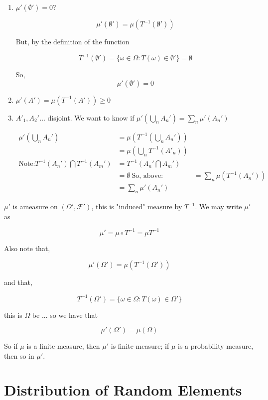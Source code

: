 \documentclass[11pt,fleqn]{book} %
\begin{document}
	\begin{enumerate}
		\item $\mu'(\emptyset') = 0$?


				$$\mu'(\emptyset') = \mu(T^{-1}(\emptyset')) $$

		But, by the definition of the function 

				$$T^{-1}(\emptyset') = \{\omega \in \Omega: T(\omega) \in \emptyset' \} = \emptyset $$

		So, 
				$$\mu'(\emptyset') = 0 $$
		\item $\mu'(A') = \mu(T^{-1}(A')) \geq 0$
		\item $A'_1, A_2' \dots$ disjoint. We want to know if $\mu'(\bigcup_n A_n') = \sum_n \mu'(A_n')$ 

				\begin{align*}
					\mu'(\bigcup_n A_n') &=\mu(T^{-1}(\bigcup_n A_n'))\\
							&=\mu (\bigcup_n T^{-1}(A'_n))\\
						\text{Note:} T^{-1}(A_n') \bigcap	T^{-1}(A_m ')&= T^{-1}(A_n' \bigcap	A_m ')\\
								&=\emptyset\
						\text{So, above:} &=\sum_n \mu(T^{-1}(A_n'))\\
							&= \sum_n \mu'(A_n')
				\end{align*}
	\end{enumerate}

$\mu'$ is ameasure on $(\Omega', \mathcal{F}')$, this is "induced" measure by $T^{-1}$. We may write $\mu'$ as

		$$\mu' = \mu \circ T^{-1} = \mu T^{-1} $$

Also note that, 

		$$ \mu'(\Omega') = \mu(T^{-1}(\Omega')) $$

and that, 

		$$T^{-1} (\Omega') = \{\omega \in \Omega: T(\omega) \in \Omega' \} $$

this is $\Omega$ be ... so we have that 

		$$\mu'(\Omega') = \mu(\Omega) $$

So if $\mu$ is a finite measure, then $\mu'$ is finite measure; if $\mu$ is a probability measure, then so in $\mu'$.



\section{Distribution of Random Elements}
\end{document}
